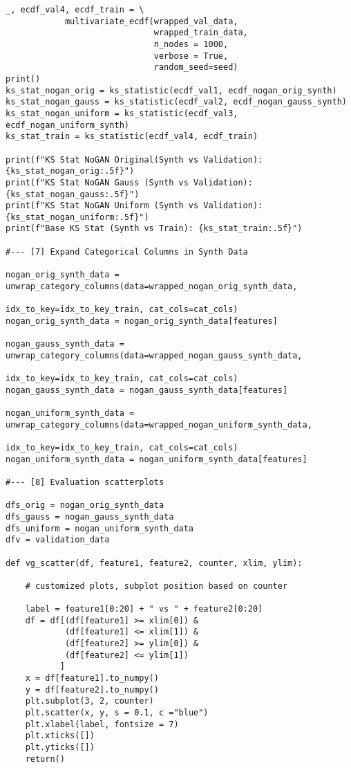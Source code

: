 \documentclass[oneside,10pt]{book}
\begin{document}
\begin{lstlisting}
_, ecdf_val4, ecdf_train = \
            multivariate_ecdf(wrapped_val_data, 
                              wrapped_train_data, 
                              n_nodes = 1000, 
                              verbose = True,
                              random_seed=seed)            
print()            
ks_stat_nogan_orig = ks_statistic(ecdf_val1, ecdf_nogan_orig_synth)
ks_stat_nogan_gauss = ks_statistic(ecdf_val2, ecdf_nogan_gauss_synth)
ks_stat_nogan_uniform = ks_statistic(ecdf_val3, ecdf_nogan_uniform_synth)
ks_stat_train = ks_statistic(ecdf_val4, ecdf_train)

print(f"KS Stat NoGAN Original(Synth vs Validation): {ks_stat_nogan_orig:.5f}")
print(f"KS Stat NoGAN Gauss (Synth vs Validation): {ks_stat_nogan_gauss:.5f}")
print(f"KS Stat NoGAN Uniform (Synth vs Validation): {ks_stat_nogan_uniform:.5f}")
print(f"Base KS Stat (Synth vs Train): {ks_stat_train:.5f}")

#--- [7] Expand Categorical Columns in Synth Data

nogan_orig_synth_data = unwrap_category_columns(data=wrapped_nogan_orig_synth_data,
                                                 idx_to_key=idx_to_key_train, cat_cols=cat_cols)
nogan_orig_synth_data = nogan_orig_synth_data[features]

nogan_gauss_synth_data = unwrap_category_columns(data=wrapped_nogan_gauss_synth_data,
                                                 idx_to_key=idx_to_key_train, cat_cols=cat_cols)
nogan_gauss_synth_data = nogan_gauss_synth_data[features]

nogan_uniform_synth_data = unwrap_category_columns(data=wrapped_nogan_uniform_synth_data,
                                                 idx_to_key=idx_to_key_train, cat_cols=cat_cols)
nogan_uniform_synth_data = nogan_uniform_synth_data[features]

#--- [8] Evaluation scatterplots

dfs_orig = nogan_orig_synth_data
dfs_gauss = nogan_gauss_synth_data
dfs_uniform = nogan_uniform_synth_data
dfv = validation_data

def vg_scatter(df, feature1, feature2, counter, xlim, ylim):

    # customized plots, subplot position based on counter

    label = feature1[0:20] + " vs " + feature2[0:20]    
    df = df[(df[feature1] >= xlim[0]) & 
            (df[feature1] <= xlim[1]) &
            (df[feature2] >= ylim[0]) &
            (df[feature2] <= ylim[1])
           ]
    x = df[feature1].to_numpy()
    y = df[feature2].to_numpy()
    plt.subplot(3, 2, counter)
    plt.scatter(x, y, s = 0.1, c ="blue")
    plt.xlabel(label, fontsize = 7)
    plt.xticks([])
    plt.yticks([])
    return()


\end{lstlisting}
\end{document}
